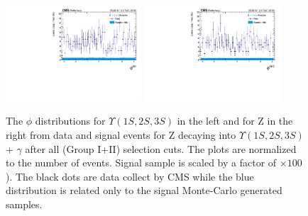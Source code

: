 \begin{figure}[!htbp]
\begin{center}
\includegraphics[width=0.45\textwidth]{figures_and_tables/outputPlots/ZtoUpsilon_Cat0_ZZZZZ/nEvts/data_x_mc/withKinCuts/h_withKin_Upsilon_phi}\hspace*{1.cm}
\includegraphics[width=0.45\textwidth]{figures_and_tables/outputPlots/ZtoUpsilon_Cat0_ZZZZZ/nEvts/data_x_mc/withKinCuts/h_withKin_Z_phi}
\end{center}\vspace*{-.5cm}
\caption{The $\phi$ distributions for $\Upsilon(1S,2S,3S)$ in the left and for Z in the right from data and signal events for Z decaying into $\Upsilon(1S,2S,3S)$ + $\gamma$ after all (Group I+II) selection cuts. The plots are normalized to the number of events. Signal sample is scaled by a factor of $\times 100$). The black dots are data collect by CMS while the blue distribution is related only to the signal Monte-Carlo generated samples.}
\label{fig:phiUpsilon_and_Z_ZtoUpsilon_Cat0_groupI_plus_II}
\end{figure}


